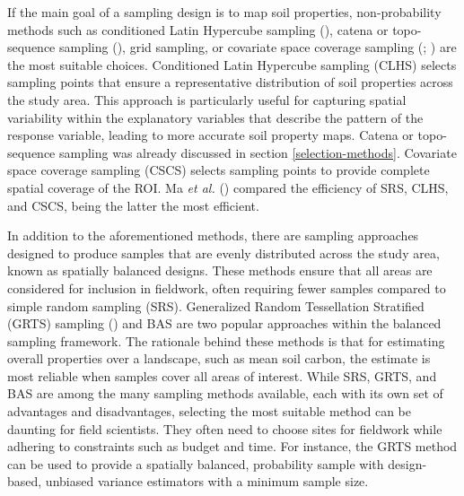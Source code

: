 \documentclass[
  10pt,
  b5paper,
  oneside]{book}
\begin{document}
If the main goal of a sampling design is to map soil properties, non-probability methods such as conditioned Latin Hypercube sampling (), catena or topo-sequence sampling (), grid sampling, or covariate space coverage sampling (; ) are the most suitable choices. Conditioned Latin Hypercube sampling (CLHS) selects sampling points that ensure a representative distribution of soil properties across the study area. This approach is particularly useful for capturing spatial variability within the explanatory variables that describe the pattern of the response variable, leading to more accurate soil property maps. Catena or topo-sequence sampling was already discussed in section \ref{selection-methods}. Covariate space coverage sampling (CSCS) selects sampling points to provide complete spatial coverage of the ROI. Ma \emph{et al.} () compared the efficiency of SRS, CLHS, and CSCS, being the latter the most efficient.

In addition to the aforementioned methods, there are sampling approaches designed to produce samples that are evenly distributed across the study area, known as spatially balanced designs. These methods ensure that all areas are considered for inclusion in fieldwork, often requiring fewer samples compared to simple random sampling (SRS). Generalized Random Tessellation Stratified (GRTS) sampling () and BAS are two popular approaches within the balanced sampling framework. The rationale behind these methods is that for estimating overall properties over a landscape, such as mean soil carbon, the estimate is most reliable when samples cover all areas of interest. While SRS, GRTS, and BAS are among the many sampling methods available, each with its own set of advantages and disadvantages, selecting the most suitable method can be daunting for field scientists. They often need to choose sites for fieldwork while adhering to constraints such as budget and time. For instance, the GRTS method can be used to provide a spatially balanced, probability sample with design-based, unbiased variance estimators with a minimum sample size.
\end{document}
